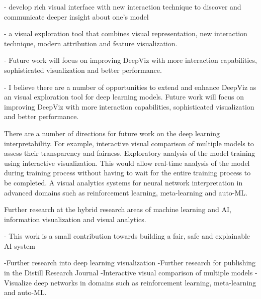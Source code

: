 - develop rich visual interface with new interaction technique to discover and communicate deeper insight about one's model

- a visual exploration tool that combines visual representation, new interaction technique, modern attribution and feature visualization.

- Future work will focus on improving DeepViz with more interaction capabilities, sophisticated visualization and better performance.

- I believe there are a number of opportunities to extend and enhance DeepViz as an visual exploration tool for deep learning models. Future work will focus on improving DeepViz with more interaction capabilities, sophisticated visualization and better performance.

There are a number of directions for future work on the deep learning interpretability. For example, interactive visual comparison of multiple models to assess their transparency and fairness. Exploratory analysis of the model training using interactive visualization. This would allow real-time analysis of the model during training process without having to wait for the entire training process to be completed. A visual analytics systems for neural network interpretation in advanced domains such as reinforcement learning, meta-learning and auto-ML.

Further research at the hybrid research areas of machine learning and AI, information visualization and visual analytics.

- This work is a small contribution towards building a fair, safe and explainable AI system

-Further research into deep learning visualization
-Further research for publishing in the Distill Research Journal
-Interactive visual comparison of multiple models 
-Visualize deep networks in domains such as reinforcement learning, meta-learning and auto-ML.
\fi %